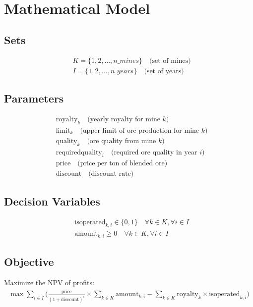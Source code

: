 \documentclass{article}
\begin{document}
\section*{Mathematical Model}

\subsection*{Sets}
\begin{align*}
    & K = \{1, 2, \ldots, n\_mines\} \quad \text{(set of mines)} \\
    & I = \{1, 2, \ldots, n\_years\} \quad \text{(set of years)}
\end{align*}

\subsection*{Parameters}
\begin{align*}
    & \text{royalty}_{k} \quad \text{(yearly royalty for mine } k) \\
    & \text{limit}_{k} \quad \text{(upper limit of ore production for mine } k) \\
    & \text{quality}_{k} \quad \text{(ore quality from mine } k) \\
    & \text{requiredquality}_{i} \quad \text{(required ore quality in year } i) \\
    & \text{price} \quad \text{(price per ton of blended ore)} \\
    & \text{discount} \quad \text{(discount rate)}
\end{align*}

\subsection*{Decision Variables}
\begin{align*}
    & \text{isoperated}_{k,i} \in \{0, 1\} \quad \forall k \in K, \forall i \in I \\
    & \text{amount}_{k,i} \geq 0 \quad \forall k \in K, \forall i \in I
\end{align*}

\subsection*{Objective}
Maximize the NPV of profits:
\begin{align*}
    \max \sum_{i \in I} \Bigg(\frac{\text{price}}{(1 + \text{discount})^{i}} \times \sum_{k \in K} \text{amount}_{k,i} - \sum_{k \in K} \text{royalty}_{k} \times \text{isoperated}_{k,i}\Bigg)
\end{align*}
\end{document}
